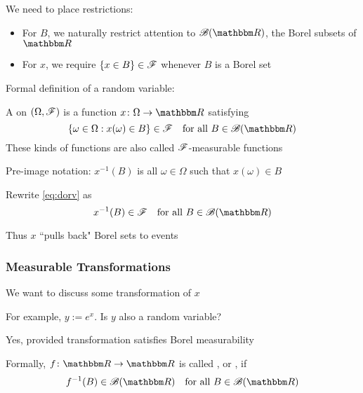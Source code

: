 \begin{frame}

    \vspace{2em}
    We need to place restrictions:
    \begin{itemize}
        \item For $B$, we naturally
    restrict attention to $\bB(\RR)$, the Borel subsets of $\RR$
        \item For $x$, we require $\{x \in B\} \in \mathscr F$ whenever $B$ is a Borel set
    \end{itemize}
    
    Formal definition of a random variable:
    
    A  on $(\Omega, \mathscr F)$ is a function
    $x \colon \Omega \to \RR$ satisfying 
    \begin{equation}
        \label{eq:dorv}
        \setntn{\omega \in \Omega}{x(\omega) \in B} \in \fF
        \quad \text{for all } B \in \bB(\RR)
    \end{equation}
    These kinds of functions are also  called $\mathscr F$-measurable functions
    
\end{frame}

\begin{frame}

    \vspace{2em}
    Pre-image notation: $x^{-1}(B)$ is all $\omega \in \Omega$ such that $x(\omega)
    \in B$
    
    Rewrite \eqref{eq:dorv} as 
    \begin{equation*}
        x^{-1}(B) \in \fF \quad \text{for all } B \in \bB(\RR)
    \end{equation*}
    
    Thus $x$ ``pulls back" Borel sets to events
    
\end{frame}

\begin{frame}
    \frametitle{Measurable Transformations}
    
    \vspace{2em}
    We want to discuss some transformation of $x$
    
    For example, $y := e^x$.
    Is $y$ also a random variable? 
    
    Yes, provided transformation satisfies  Borel
    measurability
    
    \vspace{.7em}
    Formally, $f \colon \RR \to \RR$ is called 
    , or , if
    \begin{equation}
        \label{eq:bm}
        f^{-1}(B) \in \bB(\RR)
        \quad \text{for all } B \in \bB(\RR)
    \end{equation}
    
\end{frame}

